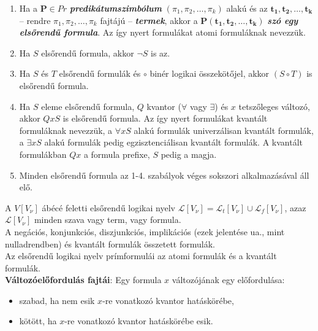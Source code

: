 \documentclass[tikz,12pt,margin=0px]{article}
\begin{document}
	\begin{enumerate}
		\item	Ha a $\boldsymbol{P} \in Pr$ \textbf{\emph{predikátumszimbólum}} $(\pi_{1}, \pi_{2}, \ldots, \pi_{k})$ alakú
		és az $\boldsymbol{t_{1}, t_{2}, \ldots, t_{k}}$ -- rendre $\pi_{1}, \pi_{2}, \ldots, \pi_{k}$ fajtájú --
		\emph{\textbf{termek}}, akkor a $\boldsymbol{P(t_{1}, t_{2}, \ldots, t_{k})}$ \emph{\textbf{szó egy elsőrendű formula}}.
		Az így nyert formulákat atomi formuláknak nevezzük.
		
		\item	Ha $S$ elsőrendű formula, akkor $\neg S$ is az.
		
		\item	Ha $S$ és $T$ elsőrendű formulák és $\circ$ binér logikai összekötőjel,
		akkor $(S \circ T)$ is elsőrendű formula.
		
		\item	Ha $S$ eleme elsőrendű formula, $Q$ kvantor ($\forall$ vagy $\exists$) és $x$
		tetszőleges változó, akkor $QxS$ is elsőrendű formula. Az így nyert formulákat kvantált formuláknak nevezzük,
		a $\forall xS$ alakú formulák univerzálisan kvantált formulák, a $\exists xS$ alakú formulák
		pedig egzisztenciálisan kvantált formulák. A kvantált formulákban $Qx$ a formula prefixe, $S$
		pedig a magja.
		
		\item	Minden elsőrendű formula az 1-4. szabályok véges sokszori alkalmazásával áll elő.
	\end{enumerate}
	
    \noindent A $V[V_{\nu}]$ ábécé feletti elsőrendű logikai nyelv $\mathcal{L}[V_{\nu}] = \mathcal{L}_{t}[V_{\nu}] \cup \mathcal{L}_{f}[V_{\nu}]$, azaz $\mathcal{L}[V_{\nu}]$ minden szava vagy term, vagy formula.\\
	
	\noindent A negációs, konjunkciós, diszjunkciós, implikációs (ezek jelentése ua., mint nulladrendben) és kvantált formulák összetett formulák.\\
	
	\noindent Az elsőrendű logikai nyelv prímformulái az atomi formulák és a kvantált formulák.\\
	
	\noindent \textbf{Változóelőfordulás fajtái}: Egy formula $x$ változójának egy előfordulása:
	
	\begin{itemize}
		\item	szabad, ha nem esik $x$-re vonatkozó kvantor hatáskörébe,
		
		\item	kötött, ha $x$-re vonatkozó kvantor hatáskörébe esik.
	\end{itemize}
	
\end{document}
